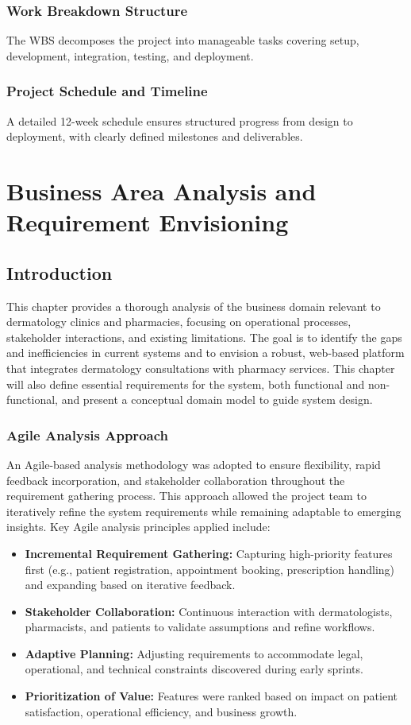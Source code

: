 \documentclass[12pt,a4paper]{report}
\begin{document}
\subsection{Work Breakdown Structure}
The WBS decomposes the project into manageable tasks covering setup, development, integration, testing, and deployment.



\subsection{Project Schedule and Timeline}
A detailed 12-week schedule ensures structured progress from design to deployment, with clearly defined milestones and deliverables.


\chapter{Business Area Analysis and Requirement Envisioning}

\section{Introduction}
This chapter provides a thorough analysis of the business domain relevant to dermatology clinics and pharmacies, focusing on operational processes, stakeholder interactions, and existing limitations. The goal is to identify the gaps and inefficiencies in current systems and to envision a robust, web-based platform that integrates dermatology consultations with pharmacy services. This chapter will also define essential requirements for the system, both functional and non-functional, and present a conceptual domain model to guide system design.

\subsection{Agile Analysis Approach}
An Agile-based analysis methodology was adopted to ensure flexibility, rapid feedback incorporation, and stakeholder collaboration throughout the requirement gathering process. This approach allowed the project team to iteratively refine the system requirements while remaining adaptable to emerging insights. Key Agile analysis principles applied include:

\begin{itemize}
    \item \textbf{Incremental Requirement Gathering:} Capturing high-priority features first (e.g., patient registration, appointment booking, prescription handling) and expanding based on iterative feedback.
    \item \textbf{Stakeholder Collaboration:} Continuous interaction with dermatologists, pharmacists, and patients to validate assumptions and refine workflows.
    \item \textbf{Adaptive Planning:} Adjusting requirements to accommodate legal, operational, and technical constraints discovered during early sprints.
    \item \textbf{Prioritization of Value:} Features were ranked based on impact on patient satisfaction, operational efficiency, and business growth.
\end{itemize}
\end{document}
